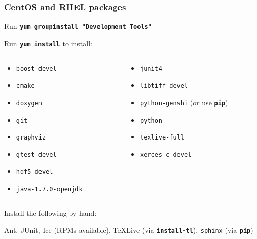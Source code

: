 \documentclass{beamer}
\newcommand{\cmd}[1]{\textbf{\texttt{#1}}}
\newcommand{\pkg}[1]{\texttt{#1}}
\begin{document}
\begin{frame}
  \frametitle{CentOS and RHEL packages}
  \scriptsize
  Run \cmd{yum groupinstall "Development Tools"}
  \bigskip

  Run \cmd{yum install} to install:
  \begin{columns}
    \begin{column}{.5\linewidth}
      \begin{itemize}
      \item[] \pkg{boost-devel}
      \item[] \pkg{cmake}
      \item[] \pkg{doxygen}
      \item[] \pkg{git}
      \item[] \pkg{graphviz}
      \item[] \pkg{gtest-devel}
      \item[] \pkg{hdf5-devel}
      \item[] \pkg{java-1.7.0-openjdk}
      \end{itemize}
    \end{column}
    \begin{column}{.5\linewidth}
      \begin{itemize}
      \item[] \pkg{junit4}
      \item[] \pkg{libtiff-devel}
      \item[] \pkg{python-genshi} (or use \cmd{pip})
      \item[] \pkg{python}
      \item[] \pkg{texlive-full}
      \item[] \pkg{xerces-c-devel}
      \end{itemize}
    \end{column}
  \end{columns}
\bigskip
Install the following by hand:

Ant, JUnit, Ice (RPMs available),
\TeX{}Live (via \cmd{install-tl}),
\pkg{sphinx} (via \cmd{pip})
\end{frame}
\end{document}
